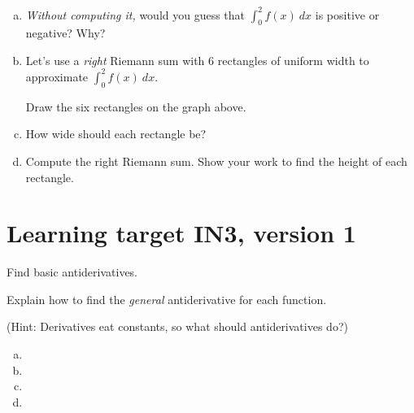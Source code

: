 \begin{enumerate}[(a)]
    \item \textit{Without computing it,} would you guess that $\displaystyle\int_0^2 f(x)\ dx$ is positive or negative? Why?
    \item Let's use a \textit{right} Riemann sum with 6 rectangles of uniform width to approximate $\displaystyle\int_0^2 f(x)\ dx$.

    Draw the six rectangles on the graph above.
    \item How wide should each rectangle be?
    \vfill
    \item Compute the right Riemann sum. Show your work to find the height of each rectangle.
    \vfill
    \vfill
\end{enumerate}
\fi

\pagebreak
\iffalse
\section{Learning target IN3, version 1} %

Find basic antiderivatives.

\hrulefill

Explain how to find the \textit{general} antiderivative for each function. 

(Hint: Derivatives eat constants, so what should antiderivatives do?)

\begin{enumerate}[(a)]
\item
{}

\item
{}

\item
{}

\item
{}

\end{enumerate}

